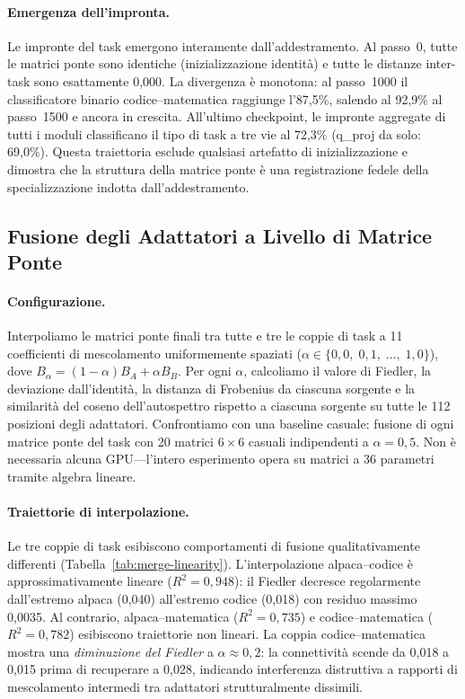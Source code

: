 \documentclass[11pt]{article}
\begin{document}
\paragraph{Emergenza dell'impronta.}
Le impronte del task emergono interamente dall'addestramento. Al
passo~0, tutte le matrici ponte sono identiche (inizializzazione
identit\`a) e tutte le distanze inter-task sono esattamente 0,000. La
divergenza \`e monotona: al passo~1000 il classificatore binario
codice--matematica raggiunge l'87,5\%, salendo al 92,9\% al passo~1500
e ancora in crescita. All'ultimo checkpoint, le impronte aggregate di
tutti i moduli classificano il tipo di task a tre vie al 72,3\%
(q\_proj da solo: 69,0\%). Questa traiettoria esclude
qualsiasi artefatto di inizializzazione e dimostra che la struttura
della matrice ponte \`e una registrazione fedele della specializzazione
indotta dall'addestramento.

\subsection{Fusione degli Adattatori a Livello di Matrice Ponte}
\label{sec:exp-merging}

\paragraph{Configurazione.}
Interpoliamo le matrici ponte finali tra tutte e tre le coppie di task a
11 coefficienti di mescolamento uniformemente spaziati ($\alpha \in
\{0{,}0,\; 0{,}1,\; \ldots,\; 1{,}0\}$), dove
$B_\alpha = (1 - \alpha) B_A + \alpha B_B$. Per ogni $\alpha$,
calcoliamo il valore di Fiedler, la deviazione dall'identit\`a, la
distanza di Frobenius da ciascuna sorgente e la similarit\`a del coseno
dell'autospettro rispetto a ciascuna sorgente su tutte le 112 posizioni
degli adattatori. Confrontiamo con una baseline casuale: fusione di ogni
matrice ponte del task con 20 matrici $6 \times 6$ casuali indipendenti
a $\alpha = 0{,}5$. Non \`e necessaria alcuna GPU---l'intero
esperimento opera su matrici a 36 parametri tramite algebra lineare.

\paragraph{Traiettorie di interpolazione.}
Le tre coppie di task esibiscono comportamenti di fusione
qualitativamente differenti (Tabella~\ref{tab:merge-linearity}).
L'interpolazione alpaca--codice \`e approssimativamente lineare
($R^2 = 0{,}948$): il Fiedler decresce regolarmente dall'estremo alpaca
(0,040) all'estremo codice (0,018) con residuo massimo 0,0035. Al
contrario, alpaca--matematica ($R^2 = 0{,}735$) e codice--matematica
($R^2 = 0{,}782$) esibiscono traiettorie non lineari. La coppia
codice--matematica mostra una \emph{diminuzione del Fiedler} a
$\alpha \approx 0{,}2$: la connettivit\`a scende da 0,018 a 0,015
prima di recuperare a 0,028, indicando interferenza distruttiva a
rapporti di mescolamento intermedi tra adattatori strutturalmente
dissimili.
\end{document}
